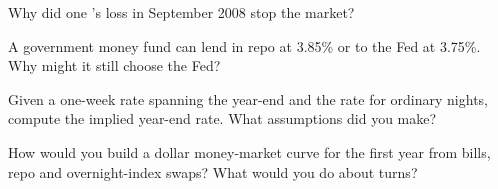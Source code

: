 \begin{interviewq}\label{iq:m2:money-markets:3}
Why did one 's loss in September 2008 stop the  market?
\end{interviewq}

\begin{interviewq}\label{iq:m2:money-markets:4}
A government money fund can lend in repo at 3.85\% or to the Fed at 3.75\%.
Why might it still choose the Fed?
\end{interviewq}

\begin{interviewq}\label{iq:m2:money-markets:5}
Given a one-week rate spanning the year-end and the rate for ordinary nights,
compute the implied year-end rate. What assumptions did you make?
\end{interviewq}

\begin{interviewq}\label{iq:m2:money-markets:6}
How would you build a dollar money-market curve for the first year from
bills, repo and overnight-index swaps? What would you do about turns?
\end{interviewq}
